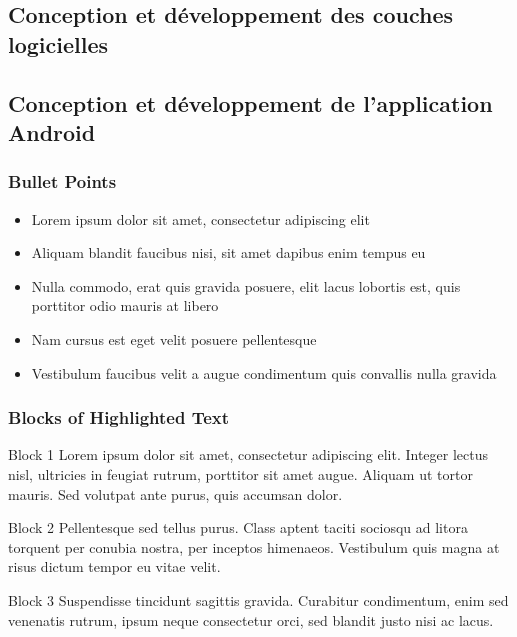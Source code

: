 \documentclass{beamer}
\begin{document}
\subsection{Conception et développement des couches logicielles}


\subsection{Conception et développement de l'application Android}
\begin{frame}
\frametitle{Bullet Points}
\begin{itemize}
\item Lorem ipsum dolor sit amet, consectetur adipiscing elit
\item Aliquam blandit faucibus nisi, sit amet dapibus enim tempus eu
\item Nulla commodo, erat quis gravida posuere, elit lacus lobortis est, quis porttitor odio mauris at libero
\item Nam cursus est eget velit posuere pellentesque
\item Vestibulum faucibus velit a augue condimentum quis convallis nulla gravida
\end{itemize}
\end{frame}


\begin{frame}
\frametitle{Blocks of Highlighted Text}
\begin{block}{Block 1}
Lorem ipsum dolor sit amet, consectetur adipiscing elit. Integer lectus nisl, ultricies in feugiat rutrum, porttitor sit amet augue. Aliquam ut tortor mauris. Sed volutpat ante purus, quis accumsan dolor.
\end{block}

\begin{block}{Block 2}
Pellentesque sed tellus purus. Class aptent taciti sociosqu ad litora torquent per conubia nostra, per inceptos himenaeos. Vestibulum quis magna at risus dictum tempor eu vitae velit.
\end{block}

\begin{block}{Block 3}
Suspendisse tincidunt sagittis gravida. Curabitur condimentum, enim sed venenatis rutrum, ipsum neque consectetur orci, sed blandit justo nisi ac lacus.
\end{block}
\end{frame}
\end{document}
